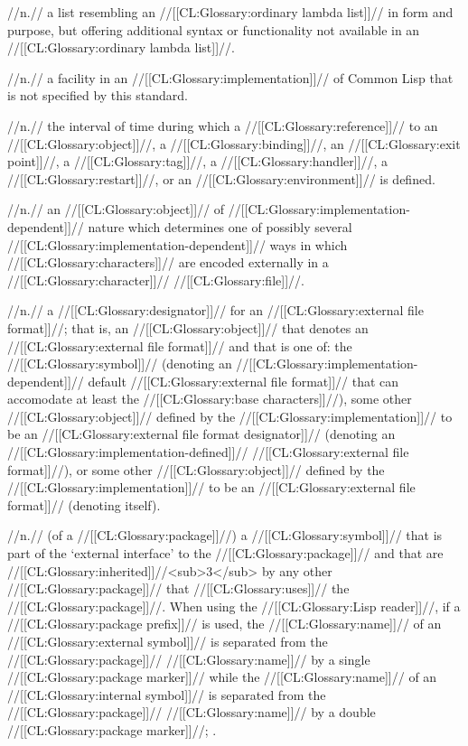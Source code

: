 //n.// a list resembling an //[[CL:Glossary:ordinary lambda list]]// in form and purpose, but offering additional syntax or functionality not available in an //[[CL:Glossary:ordinary lambda list]]//. 
 
 //n.// a facility in an //[[CL:Glossary:implementation]]// of Common Lisp that is not specified by this standard.

 //n.// the interval of time during which a //[[CL:Glossary:reference]]// to an //[[CL:Glossary:object]]//, a //[[CL:Glossary:binding]]//, an //[[CL:Glossary:exit point]]//, a //[[CL:Glossary:tag]]//, a //[[CL:Glossary:handler]]//, a //[[CL:Glossary:restart]]//, or an //[[CL:Glossary:environment]]// is defined.
 
 //n.// an //[[CL:Glossary:object]]// of //[[CL:Glossary:implementation-dependent]]// nature which determines one of possibly several //[[CL:Glossary:implementation-dependent]]// ways in which //[[CL:Glossary:characters]]// are encoded externally in a //[[CL:Glossary:character]]// //[[CL:Glossary:file]]//.

 //n.// a //[[CL:Glossary:designator]]// for an //[[CL:Glossary:external file format]]//; that is, an //[[CL:Glossary:object]]// that denotes an //[[CL:Glossary:external file format]]// and that is one of: the //[[CL:Glossary:symbol]]//  (denoting an //[[CL:Glossary:implementation-dependent]]// default //[[CL:Glossary:external file format]]// that can accomodate at least the //[[CL:Glossary:base characters]]//), some other //[[CL:Glossary:object]]// defined by the //[[CL:Glossary:implementation]]// to be an //[[CL:Glossary:external file format designator]]// (denoting an //[[CL:Glossary:implementation-defined]]// //[[CL:Glossary:external file format]]//), or some other //[[CL:Glossary:object]]// defined by the //[[CL:Glossary:implementation]]// to be an //[[CL:Glossary:external file format]]// (denoting itself).

 //n.// (of a //[[CL:Glossary:package]]//) a //[[CL:Glossary:symbol]]// that is part of the `external interface' to the //[[CL:Glossary:package]]// and that are //[[CL:Glossary:inherited]]//<sub>3</sub> by any other //[[CL:Glossary:package]]// that //[[CL:Glossary:uses]]// the //[[CL:Glossary:package]]//. When using the //[[CL:Glossary:Lisp reader]]//, if a //[[CL:Glossary:package prefix]]// is used, the //[[CL:Glossary:name]]// of an //[[CL:Glossary:external symbol]]// is separated from the //[[CL:Glossary:package]]// //[[CL:Glossary:name]]// by a single //[[CL:Glossary:package marker]]// while the //[[CL:Glossary:name]]// of an //[[CL:Glossary:internal symbol]]// is separated from the //[[CL:Glossary:package]]// //[[CL:Glossary:name]]// by a double //[[CL:Glossary:package marker]]//; \seesection\SymbolTokens.

